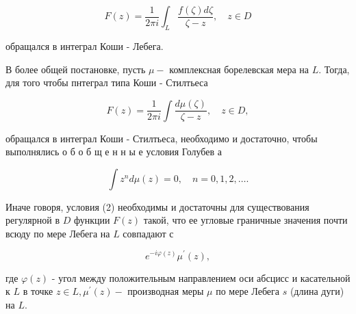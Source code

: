 \documentclass[10pt]{article}
\begin{document}
\[

F(z)=\frac{1}{2 \pi i} \int_{L} \frac{f(\zeta) d \zeta}{\zeta-z}, \quad z \in D

\]



обращался в интеграл Коши - Лебега.



В более общей постановке, пусть $\mu-$ комплексная борелевская мера на $L$. Тогда, для того чтобы пнтеграл типа Коши - Стилтьеса



\[

F(z)=\frac{1}{2 \pi i} \int \frac{d \mu(\zeta)}{\zeta-z}, \quad z \in D,

\]



обращался в интеграл Коши - Стилтьеса, необходимо и достаточно, чтобы выполнялись о б о б щ е н н ы е условия Голубев а



\[

\int z^{n} d \mu(z)=0, \quad n=0,1,2, \ldots .

\]



Иначе говоря, условия (2) необходимы и достаточны для существования регулярной в $D$ функции $F(z)$ такой, что ее угловые граничные значения почти всюду по мере Лебега на $L$ совпадают с



\[

e^{-i \varphi(z)} \mu^{\prime}(z),

\]



где $\varphi(z)$ - угол между положительным направлением оси абсцисс и касательной к $L$ в точке $z \in L, \mu^{\prime}(z)-$ производная меры $\mu$ по мере Лебега $s$ (длина дуги) на $L$.
\end{document}
